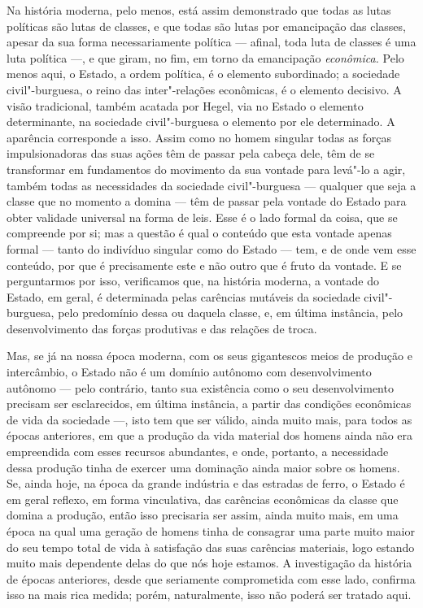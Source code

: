 Na história moderna, pelo menos, está assim demonstrado que todas as
lutas políticas são lutas de classes, e que todas são lutas por
emancipação das classes, apesar da sua forma necessariamente política ---
afinal, toda luta de classes é uma luta política ---, e que giram, no fim, em
torno da emancipação \emph{econômica. }Pelo menos aqui, o Estado, a
ordem política, é o elemento subordinado; a sociedade civil"-burguesa, o
reino das inter"-relações econômicas, é o elemento decisivo. A visão
tradicional, também acatada por Hegel, via no Estado o elemento
determinante, na sociedade civil"-burguesa o elemento por ele
determinado. A aparência corresponde a isso. Assim como no homem
singular todas as forças impulsionadoras das suas ações têm de passar
pela cabeça dele, têm de se transformar em fundamentos do movimento da
sua vontade para levá"-lo a agir, também todas as necessidades da
sociedade civil"-burguesa --- qualquer que seja a classe que no momento
a domina --- têm de passar pela vontade do Estado para obter validade
universal na forma de leis. Esse é o lado formal da coisa, que se
compreende por si; mas a questão é qual o conteúdo que esta vontade
apenas formal --- tanto do indivíduo singular como do Estado --- tem, e de
onde vem esse conteúdo, por que é precisamente este e não outro que é
fruto da vontade. E se perguntarmos por isso, verificamos que, na
história moderna, a vontade do Estado, em geral, é determinada pelas
carências mutáveis da sociedade civil"-burguesa, pelo predomínio dessa ou
daquela classe, e, em última instância, pelo desenvolvimento das forças
produtivas e das relações de troca.

Mas, se já na nossa época moderna, com os seus gigantescos meios de
produção e intercâmbio, o Estado não é um domínio autônomo com
desenvolvimento autônomo --- pelo contrário, tanto sua existência como o
seu desenvolvimento precisam ser esclarecidos, em última instância, a
partir das condições econômicas de vida da sociedade ---, isto tem que ser
válido, ainda muito mais, para todos as épocas anteriores, em que a
produção da vida material dos homens ainda não era empreendida com esses
recursos abundantes, e onde, portanto, a necessidade dessa produção tinha
de exercer uma dominação ainda maior sobre os homens. Se, ainda
hoje, na época da grande indústria e das estradas de ferro, o Estado é em geral
reflexo, em forma vinculativa, das carências 
econômicas da classe que domina a produção, então isso precisaria ser
assim, ainda muito mais, em uma época na qual uma geração de homens
tinha de consagrar uma parte muito maior do seu tempo total de vida à
satisfação das suas carências materiais, logo estando muito mais
dependente delas do que nós hoje estamos. A investigação da história de
épocas anteriores, desde que seriamente comprometida com esse lado,
confirma isso na mais rica medida; porém, naturalmente, isso não poderá
ser tratado aqui.

